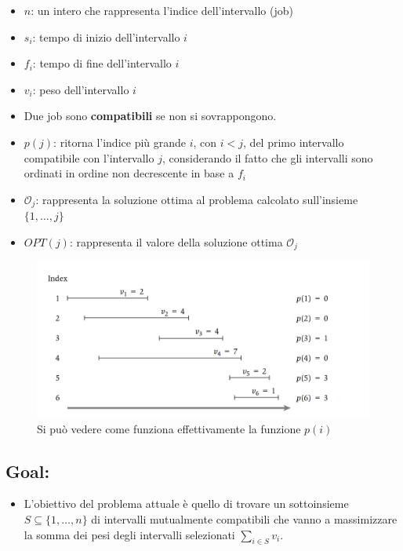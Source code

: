 \begin{itemize}
  \item
        $n$: un intero che rappresenta l'indice dell'intervallo (job)
  \item
        $s_i$: tempo di inizio dell'intervallo $i$
  \item
        $f_i$: tempo di fine dell'intervallo $i$
  \item
        $v_i$: peso dell'intervallo $i$
  \item
        Due job sono \textbf{compatibili} se non si sovrappongono.
  \item
        $p(j)$: ritorna l'indice più grande $i$, con $i < j$, del primo
        intervallo compatibile con l'intervallo $j$, considerando il fatto
        che gli intervalli sono ordinati in ordine non decrescente in base a
        $f_i$
  \item
        $\mathcal{O}_j$: rappresenta la soluzione ottima al problema
        calcolato sull'insieme $\{1, \ldots, j\}$
  \item
        $OPT(j)$: rappresenta il valore della soluzione ottima
        $\mathcal{O}_j$
\end{itemize}

\begin{figure}[H]
    \centering
    \includegraphics[width=15cm, keepaspectratio]{Programmazione_dinamica/imgs/wis_instance.png}
    \caption{Si può vedere come funziona effettivamente la funzione $p(i)$}
\end{figure}

\subsection{Goal:}

\begin{itemize}
    \item L'obiettivo del problema attuale è quello di trovare un sottoinsieme
            $S \subseteq \{1, \ldots, n\}$ di intervalli mutualmente compatibili
            che vanno a massimizzare la somma dei pesi degli intervalli
            selezionati $\sum_{i \in S} v_i$.
\end{itemize}


